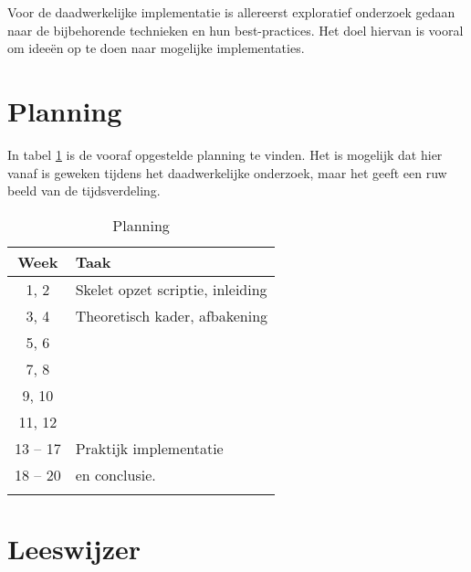 Voor de daadwerkelijke implementatie is allereerst exploratief onderzoek gedaan naar de bijbehorende technieken en hun best-practices. Het doel hiervan is vooral om ideeën op te doen naar mogelijke implementaties.

\section{Planning}
In tabel \ref{tab:planning} is de vooraf opgestelde planning te vinden. Het is mogelijk dat hier vanaf is geweken tijdens het daadwerkelijke onderzoek, maar het geeft een ruw beeld van de tijdsverdeling.

\begin{table}[h]
	\caption{Planning}
	\label{tab:planning}
	\centering
	\begin{tabular}{c p{12cm}}
		\toprule
		\textbf{Week} & \textbf{Taak}\\
		\midrule
			1, 2 & Skelet opzet scriptie, inleiding \\
			3, 4 & Theoretisch kader, afbakening \\
			5, 6 & \deeltechnieken \\
			7, 8 & \deelhuidig \\
			9, 10 & \deelverbetering \\
			11, 12 & \deelimplementatie \\
			13 -- 17 & Praktijk implementatie \\
			18 -- 20 & \deelrequirements en conclusie.\\
		\bottomrule\\
	\end{tabular}
\end{table}

\section{Leeswijzer}

